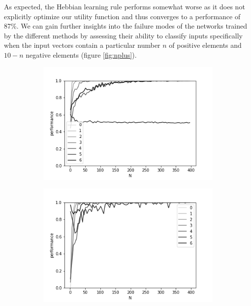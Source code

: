 \documentclass{article}
\begin{document}
As expected, the Hebbian learning rule performs somewhat worse as it does not explicitly optimize our utility function and thus converges to a performance of 87\%. We can gain further insights into the failure modes of the networks trained by the different methods by assessing their ability to classify inputs specifically when the input vectors contain a particular number $n$ of positive elements and $10-n$ negative elements (figure \ref{fig:nplus}).


\begin{figure}[h]
	\centering
	\begin{subfigure}[t]{0.32\linewidth}
		\centering
		\includegraphics[width = 1.0\linewidth, trim={10 5 40 30}, clip=true]{figures/nplus_heb.png}
	\end{subfigure}%
	\hspace{0.01 \linewidth}
	\begin{subfigure}[t]{0.32\linewidth}
		\centering
		\includegraphics[width = 1.0\linewidth, trim={10 5 40 30}, clip=true]{figures/nplus_perceptron.png}

\end{subfigure}
\end{figure}
\end{document}
